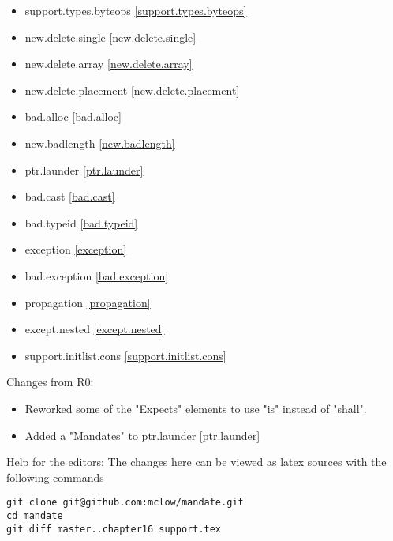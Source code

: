 \begin{multicols}{2}
\begin{itemize}
\item{support.types.byteops  \ref{support.types.byteops}}
\item{new.delete.single      \ref{new.delete.single}}
\item{new.delete.array       \ref{new.delete.array}}
\item{new.delete.placement   \ref{new.delete.placement}}
\item{bad.alloc              \ref{bad.alloc}}
\item{new.badlength          \ref{new.badlength}}
\item{ptr.launder            \ref{ptr.launder}}
\item{bad.cast               \ref{bad.cast}}
\item{bad.typeid             \ref{bad.typeid}}
\item{exception              \ref{exception}}
\item{bad.exception          \ref{bad.exception}}
\item{propagation            \ref{propagation}}
\item{except.nested          \ref{except.nested}}
\item{support.initlist.cons  \ref{support.initlist.cons}}
\end{itemize}
\end{multicols}

Changes from R0:
\begin{itemize}
\item{Reworked some of the "Expects" elements to use "is" instead of "shall".}
\item{Added a "Mandates" to ptr.launder \ref{ptr.launder}}
\end{itemize}

\vfill
Help for the editors: The changes here can be viewed as latex sources with the following commands
\begin{verbatim}
git clone git@github.com:mclow/mandate.git
cd mandate
git diff master..chapter16 support.tex
\end{verbatim}
\newpage
